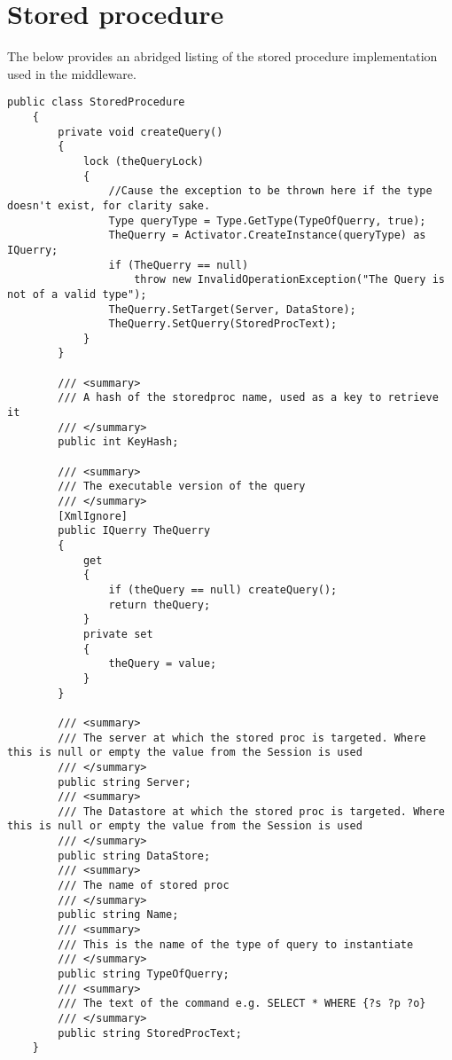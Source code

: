 \chapter{Stored procedure}
\label{app:spList}

The below provides an abridged listing of the stored procedure implementation used in the middleware.

\begin{lstlisting}[language={[Sharp]C},frame=tb,caption={The StoredProcedure class. Constructors, private fields and utility methods have been omitted for brevity.},label=lst:StoredProcedure]
 public class StoredProcedure
    {              
        private void createQuery()
        {
            lock (theQueryLock)
            {                
                //Cause the exception to be thrown here if the type doesn't exist, for clarity sake.
                Type queryType = Type.GetType(TypeOfQuerry, true);
                TheQuerry = Activator.CreateInstance(queryType) as IQuerry;
                if (TheQuerry == null)
                    throw new InvalidOperationException("The Query is not of a valid type");
                TheQuerry.SetTarget(Server, DataStore);
                TheQuerry.SetQuerry(StoredProcText);
            }
        }

        /// <summary>
        /// A hash of the storedproc name, used as a key to retrieve it
        /// </summary>
        public int KeyHash;

        /// <summary>
        /// The executable version of the query
        /// </summary>
        [XmlIgnore]
        public IQuerry TheQuerry
        {
            get
            {
                if (theQuery == null) createQuery();
                return theQuery;
            }
            private set
            {
                theQuery = value;
            }
        }

        /// <summary>
        /// The server at which the stored proc is targeted. Where this is null or empty the value from the Session is used
        /// </summary>
        public string Server;
        /// <summary>
        /// The Datastore at which the stored proc is targeted. Where this is null or empty the value from the Session is used
        /// </summary>
        public string DataStore;
        /// <summary>
        /// The name of stored proc
        /// </summary>
        public string Name;
        /// <summary>
        /// This is the name of the type of query to instantiate 
        /// </summary>
        public string TypeOfQuerry;
        /// <summary>
        /// The text of the command e.g. SELECT * WHERE {?s ?p ?o}
        /// </summary>
        public string StoredProcText;
    }
\end{lstlisting}